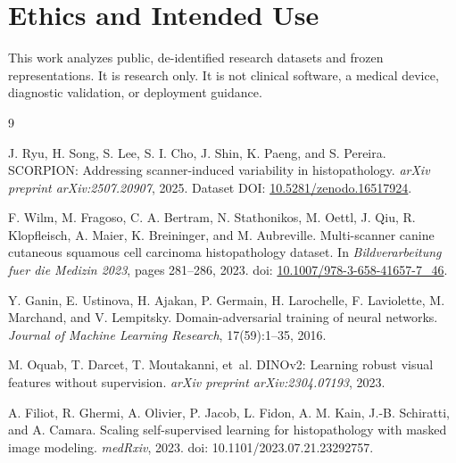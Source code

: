 \section*{Ethics and Intended Use}
This work analyzes public, de-identified research datasets and frozen representations. It is research only. It is not clinical software, a medical device, diagnostic validation, or deployment guidance.

\begin{thebibliography}{9}

J. Ryu, H. Song, S. Lee, S. I. Cho, J. Shin, K. Paeng, and S. Pereira.
\newblock SCORPION: Addressing scanner-induced variability in histopathology.
\newblock \emph{arXiv preprint arXiv:2507.20907}, 2025.
\newblock Dataset DOI: \href{https://doi.org/10.5281/zenodo.16517924}{10.5281/zenodo.16517924}.

F. Wilm, M. Fragoso, C. A. Bertram, N. Stathonikos, M. Oettl, J. Qiu, R. Klopfleisch, A. Maier, K. Breininger, and M. Aubreville.
\newblock Multi-scanner canine cutaneous squamous cell carcinoma histopathology dataset.
\newblock In \emph{Bildverarbeitung fuer die Medizin 2023}, pages 281--286, 2023.
\newblock doi: \href{https://doi.org/10.1007/978-3-658-41657-7_46}{10.1007/978-3-658-41657-7\_46}.

Y. Ganin, E. Ustinova, H. Ajakan, P. Germain, H. Larochelle, F. Laviolette, M. Marchand, and V. Lempitsky.
\newblock Domain-adversarial training of neural networks.
\newblock \emph{Journal of Machine Learning Research}, 17(59):1--35, 2016.

M. Oquab, T. Darcet, T. Moutakanni, et~al.
\newblock DINOv2: Learning robust visual features without supervision.
\newblock \emph{arXiv preprint arXiv:2304.07193}, 2023.

A. Filiot, R. Ghermi, A. Olivier, P. Jacob, L. Fidon, A. M. Kain, J.-B. Schiratti, and A. Camara.
\newblock Scaling self-supervised learning for histopathology with masked image modeling.
\newblock \emph{medRxiv}, 2023. doi: 10.1101/2023.07.21.23292757.

\end{thebibliography}



